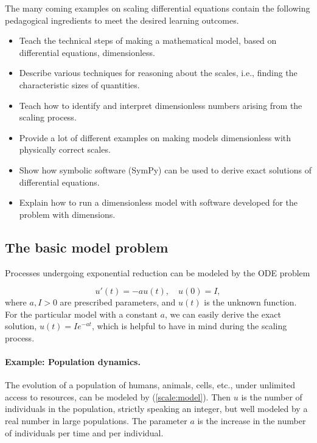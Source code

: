 \documentclass[graybox,envcountchap,sectrefs,final]{svmonodo}
\begin{document}
The many coming examples on scaling differential equations contain
the following pedagogical ingredients to meet the desired learning outcomes.

\begin{itemize}
 \item Teach the technical steps of making a mathematical model, based
   on differential equations, dimensionless.

 \item Describe various techniques for reasoning about the scales, i.e.,
   finding the characteristic sizes of quantities.

 \item Teach how to identify and interpret dimensionless numbers arising
   from the scaling process.

 \item Provide a lot of different examples on making models dimensionless
   with physically correct scales.

 \item Show how symbolic software (SymPy) can be used
   to derive exact solutions of differential equations.

 \item Explain how to run a dimensionless model with software developed
   for the problem with dimensions.
\end{itemize}

\noindent
\subsection{The basic model problem}

Processes undergoing exponential reduction can be modeled by the ODE
problem

\begin{equation}
u'(t) = -au(t),\quad u(0)=I,
\label{scale:model}
\end{equation}
where $a,I>0$ are prescribed parameters, and $u(t)$ is the unknown function.
For the particular model with a constant $a$, we can easily derive the exact
solution, $u(t)=Ie^{-at}$,
which is helpful to have in mind during the scaling process.

\paragraph{Example: Population dynamics.}
The evolution of a population of humans, animals, cells, etc.,
under unlimited access to resources, can be
modeled by (\ref{scale:model}). Then $u$ is the number of
individuals in the population, strictly speaking an integer, but well
modeled by a real number in large populations.
The parameter $a$ is the increase in the number of individuals per
time and per individual.
\end{document}
